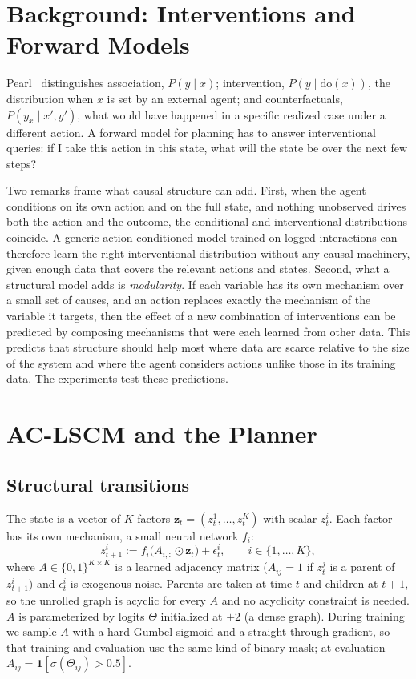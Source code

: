 \documentclass[11pt]{article}
\newcommand{\z}{\mathbf{z}}
\newcommand{\doop}{\mathrm{do}}
\begin{document}
\section{Background: Interventions and Forward Models}
\label{sec:background}

Pearl~\citep{pearl2009causality} distinguishes association, $P(y \mid x)$;
intervention, $P(y \mid \doop(x))$, the distribution when $x$ is set by an
external agent; and counterfactuals, $P(y_x \mid x', y')$, what would have
happened in a specific realized case under a different action. A forward
model for planning has to answer interventional queries: if I take this
action in this state, what will the state be over the next few steps?

Two remarks frame what causal structure can add. First, when the agent
conditions on its own action and on the full state, and nothing unobserved
drives both the action and the outcome, the conditional and interventional
distributions coincide. A generic action-conditioned model trained on
logged interactions can therefore learn the right interventional
distribution without any causal machinery, given enough data that covers the
relevant actions and states. Second, what a structural model adds is
\emph{modularity}. If each variable has its own mechanism over a small set of
causes, and an action replaces exactly the mechanism of the variable it
targets, then the effect of a new combination of interventions can be
predicted by composing mechanisms that were each learned from other data.
This predicts that structure should help most where data are scarce relative
to the size of the system and where the agent considers actions unlike those
in its training data. The experiments test these predictions.

\section{AC-LSCM and the Planner}
\label{sec:arch}

\subsection{Structural transitions}
The state is a vector of $K$ factors $\z_t = (z_t^1, \dots, z_t^K)$ with
scalar $z_t^i$. Each factor has its own mechanism, a small neural network
$f_i$:
\begin{equation}
  z_{t+1}^i := f_i\big(A_{i,:} \odot \z_t\big) + \epsilon_t^i,
  \qquad i \in \{1,\dots,K\},
  \label{eq:sem}
\end{equation}
where $A \in \{0,1\}^{K\times K}$ is a learned adjacency matrix ($A_{ij} = 1$
if $z^j_t$ is a parent of $z^i_{t+1}$) and $\epsilon_t^i$ is exogenous noise.
Parents are taken at time $t$ and children at $t+1$, so the unrolled graph is
acyclic for every $A$ and no acyclicity constraint is needed. $A$ is
parameterized by logits $\Theta$ initialized at $+2$ (a dense graph). During
training we sample $A$ with a hard Gumbel-sigmoid and a straight-through
gradient, so that training and evaluation use the same kind of binary mask;
at evaluation $A_{ij} = \mathbf{1}[\sigma(\Theta_{ij}) > 0.5]$.
\end{document}
